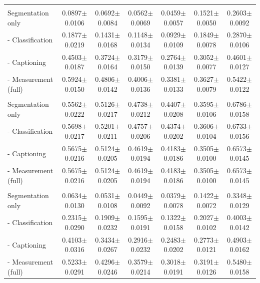 \documentclass[fleqn,10pt]{wlscirep}
\begin{document}
\begin{appendices}
\begin{table}[p]
\begin{threeparttable}
\begin{tabular}{lcccccc}
\rowcolor{gray!20}
\multicolumn{7}{c}{\textbf{SMU-HMC Testset} ($n=400$)} \\
Segmentation only
& 0.0897$\pm$0.0106
& 0.0692$\pm$0.0084
& 0.0562$\pm$0.0069
& 0.0459$\pm$0.0057
& 0.1521$\pm$0.0050
& 0.2603$\pm$0.0092 \\
- Classification
& 0.1877$\pm$0.0219
& 0.1431$\pm$0.0168
& 0.1148$\pm$0.0134
& 0.0929$\pm$0.0109
& 0.1849$\pm$0.0078
& 0.2870$\pm$0.0106 \\
- Captioning
& 0.4503$\pm$0.0187
& 0.3724$\pm$0.0164
& 0.3179$\pm$0.0150
& 0.2764$\pm$0.0139
& 0.3052$\pm$0.0077
& 0.4601$\pm$0.0127 \\
- Measurement (full)
& 0.5924$\pm$0.0150
& 0.4806$\pm$0.0142
& 0.4006$\pm$0.0136
& 0.3381$\pm$0.0133
& 0.3627$\pm$0.0079
& 0.5422$\pm$0.0122 \\

\midrule
\rowcolor{gray!20}
\multicolumn{7}{c}{\textbf{KMVE Testset} ($n=492$)} \\
Segmentation only
& 0.5562$\pm$0.0222
& 0.5126$\pm$0.0217
& 0.4738$\pm$0.0212
& 0.4407$\pm$0.0208
& 0.3595$\pm$0.0106
& 0.6786$\pm$0.0158 \\
- Classification
& 0.5698$\pm$0.0217
& 0.5201$\pm$0.0211
& 0.4757$\pm$0.0206
& 0.4374$\pm$0.0202
& 0.3606$\pm$0.0104
& 0.6733$\pm$0.0156 \\
- Captioning
& 0.5675$\pm$0.0216
& 0.5124$\pm$0.0205
& 0.4619$\pm$0.0194
& 0.4183$\pm$0.0186
& 0.3505$\pm$0.0100
& 0.6573$\pm$0.0145 \\
- Measurement (full)
& 0.5675$\pm$0.0216
& 0.5124$\pm$0.0205
& 0.4619$\pm$0.0194
& 0.4183$\pm$0.0186
& 0.3505$\pm$0.0100
& 0.6573$\pm$0.0145 \\

\midrule
\rowcolor{gray!20}
\multicolumn{7}{c}{\textbf{ZJH-TS Testset} ($n=150$)} \\
Segmentation only
& 0.0634$\pm$0.0130
& 0.0531$\pm$0.0108
& 0.0449$\pm$0.0092
& 0.0379$\pm$0.0078
& 0.1422$\pm$0.0072
& 0.3348$\pm$0.0129 \\
- Classification
& 0.2315$\pm$0.0290
& 0.1909$\pm$0.0232
& 0.1595$\pm$0.0191
& 0.1322$\pm$0.0158
& 0.2027$\pm$0.0102
& 0.4003$\pm$0.0142 \\
- Captioning
& 0.4103$\pm$0.0316
& 0.3434$\pm$0.0267
& 0.2916$\pm$0.0232
& 0.2483$\pm$0.0202
& 0.2773$\pm$0.0121
& 0.4903$\pm$0.0162 \\
- Measurement (full)
& 0.5233$\pm$0.0291
& 0.4296$\pm$0.0246
& 0.3579$\pm$0.0214
& 0.3018$\pm$0.0191
& 0.3191$\pm$0.0126
& 0.5480$\pm$0.0158 \\
\bottomrule
\end{tabular}


\end{threeparttable}
\end{table}
\end{appendices}
\end{document}
